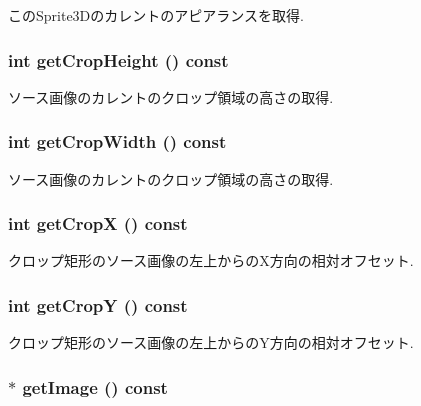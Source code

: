 このSprite3Dのカレントのアピアランスを取得. \hypertarget{classm3g_1_1Sprite3D_d6d9d6f23b7bb004c93642bcd081f4a3}{
\subsubsection[{getCropHeight}]{\setlength{\rightskip}{0pt plus 5cm}int getCropHeight () const}}
\label{classm3g_1_1Sprite3D_d6d9d6f23b7bb004c93642bcd081f4a3}


ソース画像のカレントのクロップ領域の高さの取得. \hypertarget{classm3g_1_1Sprite3D_5c6515f6706675ef31ca5dfa0a03b953}{
\subsubsection[{getCropWidth}]{\setlength{\rightskip}{0pt plus 5cm}int getCropWidth () const}}
\label{classm3g_1_1Sprite3D_5c6515f6706675ef31ca5dfa0a03b953}


ソース画像のカレントのクロップ領域の高さの取得. \hypertarget{classm3g_1_1Sprite3D_d0ba0211183decc8f0459ca598b12912}{
\subsubsection[{getCropX}]{\setlength{\rightskip}{0pt plus 5cm}int getCropX () const}}
\label{classm3g_1_1Sprite3D_d0ba0211183decc8f0459ca598b12912}


クロップ矩形のソース画像の左上からのX方向の相対オフセット. \hypertarget{classm3g_1_1Sprite3D_9ef03b219415a1f08aef6745ad5d87d0}{
\subsubsection[{getCropY}]{\setlength{\rightskip}{0pt plus 5cm}int getCropY () const}}
\label{classm3g_1_1Sprite3D_9ef03b219415a1f08aef6745ad5d87d0}


クロップ矩形のソース画像の左上からのY方向の相対オフセット. \hypertarget{classm3g_1_1Sprite3D_a8c0193b0e7d47d4b5c9f60df24c44f5}{
\subsubsection[{getImage}]{ $\ast$ getImage () const}}
\label{classm3g_1_1Sprite3D_a8c0193b0e7d47d4b5c9f60df24c44f5}


